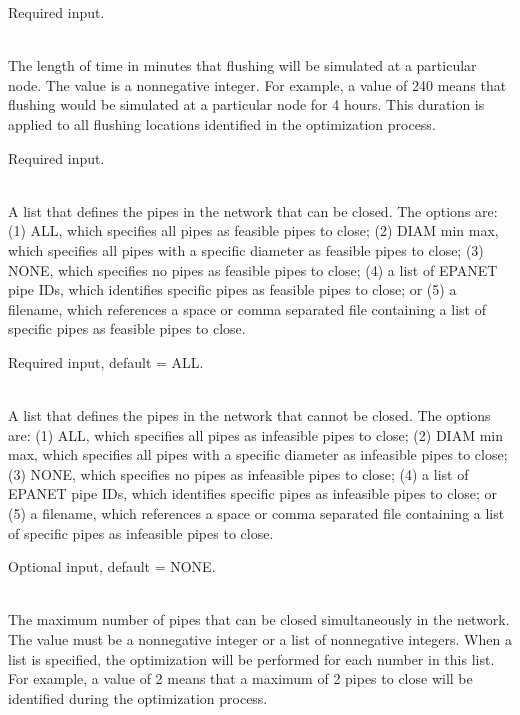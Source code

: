 \begin{description}[topsep=0pt,parsep=0.5em,itemsep=-0.4em]
\begin{description}[topsep=0pt,parsep=0.5em,itemsep=-0.4em]
\begin{description}[topsep=0pt,parsep=0.5em,itemsep=-0.4em]
                Required input.
      \item[{duration}]\hfill
\\The length of time in minutes that flushing will be simulated at a particular node. 
                The value is a nonnegative integer. For example, a value of 240 means that  
                flushing would be simulated at a particular node for 4 hours. This duration 
                is applied to all flushing locations identified in the optimization process.
                
                Required input.
    \end{description}
    \item[{close valves}]\hfill
    \begin{description}[topsep=0pt,parsep=0.5em,itemsep=-0.4em]
      \item[{feasible pipes}]\hfill
\\A list that defines the pipes in the network that can be closed. 
                The options are: (1) ALL, which specifies all pipes as feasible pipes to close;
                (2) DIAM min max, which specifies all pipes with a specific diameter as feasible pipes to close;
                (3) NONE, which specifies no pipes as feasible pipes to close;
                (4) a list of EPANET pipe IDs, which identifies specific pipes as feasible pipes to close; or
                (5) a filename, which references a space or comma separated file containing a list of 
                specific pipes as feasible pipes to close. 
                
                Required input, default = ALL.
      \item[{infeasible pipes}]\hfill
\\A list that defines the pipes in the network that cannot be closed. 
                The options are: (1) ALL, which specifies all pipes as infeasible pipes to close;
                (2) DIAM min max, which specifies all pipes with a specific diameter as infeasible pipes to close;
                (3) NONE, which specifies no pipes as infeasible pipes to close;
                (4) a list of EPANET pipe IDs, which identifies specific pipes as infeasible pipes to close; or
                (5) a filename, which references a space or comma separated file containing a list of 
                specific pipes as infeasible pipes to close. 
                
                Optional input, default = NONE.
      \item[{max pipes}]\hfill
\\The maximum number of pipes that can be closed simultaneously in the
                network. The value must be a nonnegative integer or a list of
                nonnegative integers. When a list is specified, the optimization
                will be performed for each number in this list. For example, a value of 
                2 means that a maximum of 2 pipes to close will be identified 
                during the optimization process.
                

\end{description}
\end{description}
\end{description}
